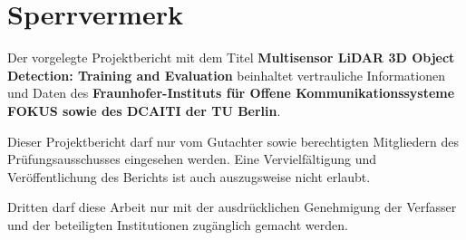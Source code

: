 \section*{Sperrvermerk}
\sloppy
Der vorgelegte Projektbericht mit dem Titel \textbf{Multisensor LiDAR 3D Object Detection: Training and Evaluation} beinhaltet vertrauliche Informationen und Daten des \textbf{Fraunhofer-Instituts für Offene Kommunikations\-systeme FOKUS sowie des DCAITI der TU Berlin}.\vspace{0.5cm}

Dieser Projektbericht darf nur vom Gutachter sowie berechtigten Mitgliedern des Prüfungsausschusses eingesehen werden. Eine Vervielfältigung und Veröffentlichung des Berichts ist auch auszugsweise nicht erlaubt.

\vspace{0.5cm}

Dritten darf diese Arbeit nur mit der ausdrücklichen Genehmigung der Verfasser und der beteiligten Institutionen zugänglich gemacht werden.
